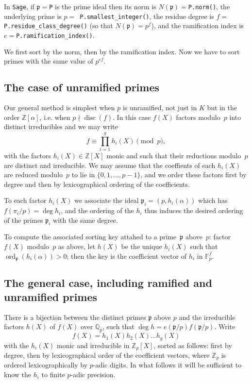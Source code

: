 \documentclass{article}
\def\Sage{{\tt Sage}}
\def\Z{{\mathbb Z}}
\def\Q{{\mathbb Q}}
\def\F{{\mathbb F}}
\def\p{{\mathfrak p}}
\DeclareMathOperator{\disc}{disc}
\DeclareMathOperator{\ord}{ord}
\begin{document}
In \Sage, if $\p=${\tt P} is the prime ideal then its norm is
$N(\p)=${\tt P.norm()}, the underlying prime is $p=${\tt
  P.smallest\_integer()}, the residue degree is $f=${\tt
  P.residue\_class\_degree()} (so that $N(\p)=p^f$), and the
ramification index is $e=${\tt P.ramification\_index()}.

We first sort by the norm, then by the ramification index. Now we have
to sort primes with the same value of $p^{ef}$.

\subsection{The case of unramified primes}

Our general method is simplest when $p$ is unramified, not just in $K$
but in the order $\Z[\alpha]$, i.e. when $p\nmid\disc(f)$.  In this
case $f(X)$ factors modulo~$p$ into distinct irreducibles and we may
write
\[
    f \equiv \prod_{i=1}^{g}h_i(X) \pmod{p},
\]
with the factors $h_i(X)\in\Z[X]$ monic and such that their reductions
modulo~$p$ are distinct and irreducible.  We may assume that the
coeffients of each $h_i(X)$ are reduced modulo~$p$ to lie in
$\{0,1,\dots,p-1\}$, and we order these factors first by degree and
then by lexicographical ordering of the coefficients.

To each factor $h_i(X)$ we associate the ideal $\p_i=(p,h_i(\alpha))$
which has $f(\pi_i/p)=\deg h_i$, and the ordering of the $h_i$ thus
induces the desired ordering of the primes $\p_i$ with the same
degree.

To compute the associated sorting key attahed to a prime~$\p$
above~$p$: factor $f(X)$ modulo~$p$ as above, let $h(X)$ be the unique
$h_i(X)$ such that $\ord_{\p}(h_i(\alpha))>0$; then the key is the
coefficient vector of $h_i$ in $\F_p^f$.

\subsection{The general case, including ramified and unramified primes}

There is a bijection between the distinct primes $\p$ above $p$ and
the irreducible factors $h(X)$ of $f(X)$ over $\Q_p$, such that $\deg h
= e(\p/p)f(\p/p)$.  Write
\[
  f(X) = h_1(X)h_2(X)\dots h_g(X)
\]
with the $h_i(X)$ monic and irreducible in $\Z_p[X]$, sorted as
follows: first by degree, then by lexicographical order of the
coefficient vectors, where $\Z_p$ is ordered lexicographically by
$p$-adic digits.  In what follows it will be sufficient to know the
$h_i$ to finite $p$-adic precision.
\end{document}

